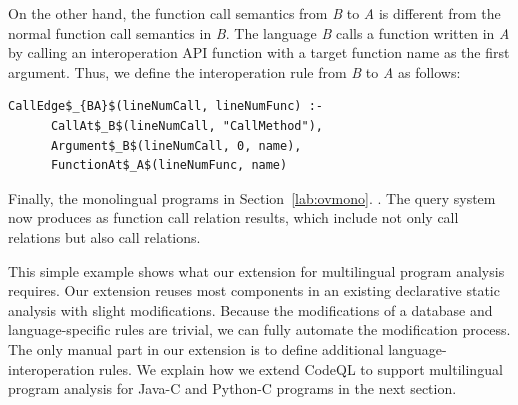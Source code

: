 \noindent
On the other hand, the function call semantics from {\it B} to {\it A} is
different from the normal function call semantics in {\it B}. The language {\it
B} calls a function written in {\it A} by calling an interoperation API
function  with a target function name as the first argument.
Thus, we define the interoperation rule from {\it B} to {\it A} as follows:

\begin{lstlisting}[style=mrule]
    CallEdge$_{BA}$(lineNumCall, lineNumFunc) :-
      CallAt$_B$(lineNumCall, "CallMethod"),
      Argument$_B$(lineNumCall, 0, name),
      FunctionAt$_A$(lineNumFunc, name)
\end{lstlisting}

Finally,    the
monolingual programs in Section~\ref{lab:ovmono}.  . The query system now produces
  as function call
relation results, which include not only  call relations but also
 call relations.

This simple example shows what our extension for multilingual program analysis
requires. Our extension reuses most components in an existing declarative
static analysis with slight modifications. Because the modifications of a
database and language-specific rules are trivial, we can fully automate the
modification process.  The only manual part in our extension is to define
additional language-interoperation rules. We explain how we extend CodeQL to
support multilingual program analysis for Java-C and Python-C programs in the
next section.
